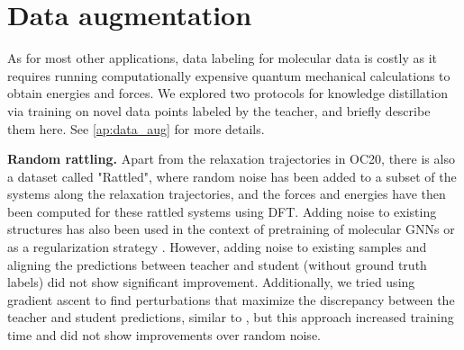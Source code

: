 \documentclass{article}
\begin{document}
\section{Data augmentation}
As for most other applications, data labeling for molecular data is costly as it requires running computationally expensive quantum mechanical calculations to obtain energies and forces. 
We explored two protocols for knowledge distillation via training on novel data points labeled by the teacher, and briefly describe them here.
See \cref{ap:data_aug} for more details. 


\textbf{Random rattling.}
Apart from the relaxation trajectories in OC20, there is also a dataset called "Rattled", where random noise has been added to a subset of the systems along the relaxation trajectories, and the forces and energies have then been computed for these rattled systems using DFT. Adding noise to existing structures has also been used in the context of pretraining of molecular GNNs \cite{zaidi2022pre, magar_crystal_2022} or as a regularization strategy \cite{godwin2021simple}. 
However, adding noise to existing samples and aligning the predictions between teacher and student (without ground truth labels) did not show significant improvement.
Additionally, we tried using gradient ascent to find perturbations that maximize the discrepancy between the teacher and student predictions, similar to \cite{schwalbe-koda_differentiable_2021}, but this approach increased training time and did not show improvements over random noise. 
\end{document}
